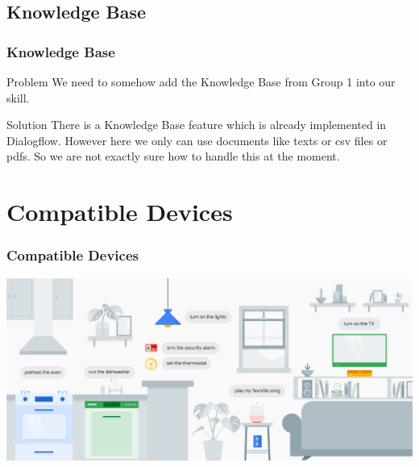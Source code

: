 \documentclass{beamer}
\begin{document}

\subsection{Knowledge Base}

\begin{frame}
\frametitle{Knowledge Base}
\begin{block}{Problem}
We need to somehow add the Knowledge Base from Group 1 into our skill.
\end{block}


\begin{block}{Solution}
There is a Knowledge Base feature which is already implemented in Dialogflow. However here we only can use documents like texts or csv files or pdfs. So we are not exactly sure how to handle this at the moment.
\end{block}

\end{frame}


\section{Compatible Devices}

\begin{frame}
\frametitle{Compatible Devices}
\begin{center}
\includegraphics[scale=0.30]{pictures/smart_home.png} 
\end{center}
\end{frame}
\end{document}
